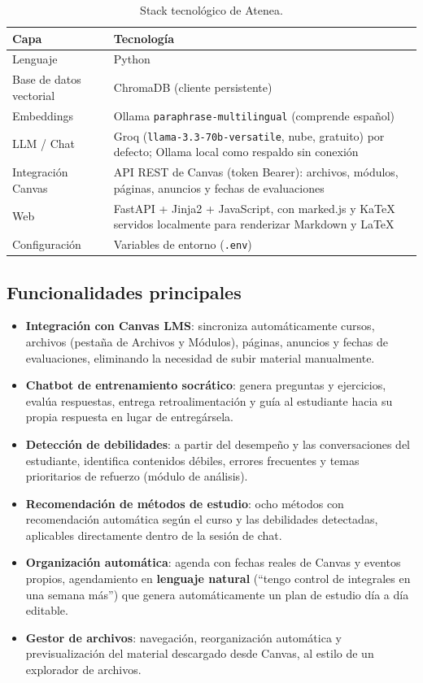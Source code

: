 \documentclass[11pt,a4paper]{article}
\begin{document}
\begin{table}[H]
\centering
\small
\begin{tabularx}{\textwidth}{@{}l Y@{}}
\toprule
\textbf{Capa} & \textbf{Tecnolog\'ia} \\
\midrule
Lenguaje & Python \\
Base de datos vectorial & ChromaDB (cliente persistente) \\
Embeddings & Ollama \texttt{paraphrase-multilingual} (comprende espa\~nol) \\
LLM / Chat & Groq (\texttt{llama-3.3-70b-versatile}, nube, gratuito) por defecto; Ollama local como respaldo sin conexi\'on \\
Integraci\'on Canvas & API REST de Canvas (token Bearer): archivos, m\'odulos, p\'aginas, anuncios y fechas de evaluaciones \\
Web & FastAPI + Jinja2 + JavaScript, con marked.js y KaTeX servidos localmente para renderizar Markdown y LaTeX \\
Configuraci\'on & Variables de entorno (\texttt{.env}) \\
\bottomrule
\end{tabularx}
\caption{Stack tecnol\'ogico de Atenea.}
\end{table}

\subsection{Funcionalidades principales}

\begin{itemize}
\item \textbf{Integraci\'on con Canvas LMS}: sincroniza autom\'aticamente cursos, archivos (pesta\~na de Archivos y M\'odulos), p\'aginas, anuncios y fechas de evaluaciones, eliminando la necesidad de subir material manualmente.
\item \textbf{Chatbot de entrenamiento socr\'atico}: genera preguntas y ejercicios, eval\'ua respuestas, entrega retroalimentaci\'on y gu\'ia al estudiante hacia su propia respuesta en lugar de entreg\'arsela.
\item \textbf{Detecci\'on de debilidades}: a partir del desempe\~no y las conversaciones del estudiante, identifica contenidos d\'ebiles, errores frecuentes y temas prioritarios de refuerzo (m\'odulo de an\'alisis).
\item \textbf{Recomendaci\'on de m\'etodos de estudio}: ocho m\'etodos con recomendaci\'on autom\'atica seg\'un el curso y las debilidades detectadas, aplicables directamente dentro de la sesi\'on de chat.
\item \textbf{Organizaci\'on autom\'atica}: agenda con fechas reales de Canvas y eventos propios, agendamiento en \textbf{lenguaje natural} (``tengo control de integrales en una semana m\'as'') que genera autom\'aticamente un plan de estudio d\'ia a d\'ia editable.
\item \textbf{Gestor de archivos}: navegaci\'on, reorganizaci\'on autom\'atica y previsualizaci\'on del material descargado desde Canvas, al estilo de un explorador de archivos.
\end{itemize}
\end{document}
